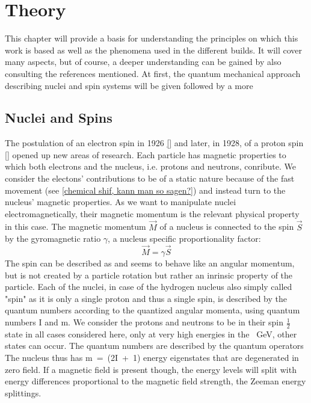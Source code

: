\chapter{Theory}\label{chap:theory}
This chapter will provide a basis for understanding the principles on which this work is based as well as the phenomena used in the different builds. It will cover many aspects, but of course, a deeper understanding can be gained by also consulting the references mentioned. At first, the quantum mechanical approach describing nuclei and spin systems will be given followed by a more 
    \section{Nuclei and Spins}
        \label{theory:section:nucleiSpins}
        The postulation of an electron spin in 1926 \ref{} and later, in 1928, of a proton spin \ref{} opened
        up new areas of research.
        Each particle has magnetic properties to which both electrons and the nucleus, i.e. protons and neutrons, conribute. We consider the electons' contributions to be of a static nature because of the fast movement (see \ref{chemical shif, kann man so sagen?}) and instead turn to the nucleus' magnetic properties. As we want to manipulate nuclei electromagnetically, their magnetic momentum is the relevant physical property in this case.
        The magnetic momentum $\vec M$ of a nucleus is connected to the spin $\vec S$ by the gyromagnetic ratio $\gamma$, a nucleus specific proportionality factor:
        \begin{equation}
            \vec M = \gamma \vec S
            \label{eq:gyromagneticRatio}
        \end{equation}
        The spin can be described as and seems to behave like an angular momentum, but is not created by a particle rotation but rather an inrinsic property of the particle. Each of the nuclei, in case of the hydrogen nucleus also simply called "spin" as it is only a single proton and thus a single spin, is described by the quantum numbers according to the quantized angular momenta, using quantum numbers I and m. We consider the protons and neutrons to be in their spin $\tfrac{1}{2}$ state in all cases considered here, only at very high energies in the \SI{}{\giga\electronvolt}, other states can occur. The quantum numbers are described by the quantum operators   The nucleus thus has m~=~(2I~+~1) energy eigenstates that are degenerated in zero field. If a magnetic field is present though, the energy levels will split with energy differences proportional to the magnetic field strength, the Zeeman energy splittings.
